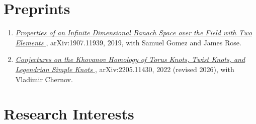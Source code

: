 \documentclass[letterpaper,sans]{moderncv}
\begin{document}
    \section{Preprints}
        \begin{enumerate}\raggedright
            \item
                \textit{%
                    \href{https://arxiv.org/abs/1907.11939}{%
                        Properties of an Infinite Dimensional Banach Space
                        over the Field with Two Elements%
                    }%
                },
                arXiv:1907.11939, 2019, with Samuel Gomez and James Rose.
            \item
                \textit{%
                    \href{https://arxiv.org/abs/2205.11430}{%
                        Conjectures on the Khovanov Homology of Torus Knots,
                        Twist Knots, and Legendrian Simple Knots%
                    }%
                },
                arXiv:2205.11430, 2022 (revised 2026),
                with Vladimir Chernov.
        \end{enumerate}
    \section{Research Interests}
\end{document}

